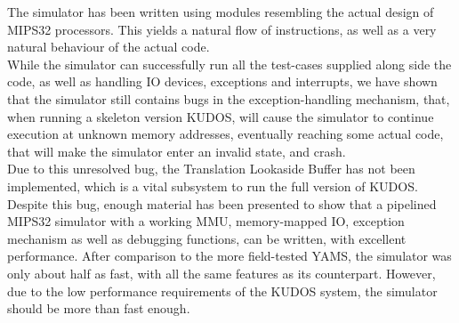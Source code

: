 The simulator has been written using modules resembling the actual design of
MIPS32 processors. This yields a natural flow of instructions, as well as a very natural
behaviour of the actual code.\\
While the simulator can successfully run all the test-cases supplied along side
the code, as well as handling IO devices, exceptions and interrupts, we have
shown that the simulator still contains bugs in the exception-handling mechanism,
that, when running a skeleton version KUDOS, will cause the simulator to
continue execution at unknown memory addresses, eventually reaching some actual
code, that will make the simulator enter an invalid state, and crash. \\
Due to this unresolved bug, the Translation Lookaside Buffer has not been implemented,
which is a vital subsystem to run the full version of KUDOS.\\
Despite this bug, enough material has been presented
to show that a pipelined MIPS32 simulator with a working MMU, memory-mapped IO,
exception mechanism as well as debugging functions, can be written, with excellent
performance. After comparison to the more field-tested YAMS, the simulator was
only about half as fast, with all the same features as its counterpart. However,
due to the low performance requirements of the KUDOS system, the simulator should
be more than fast enough.


